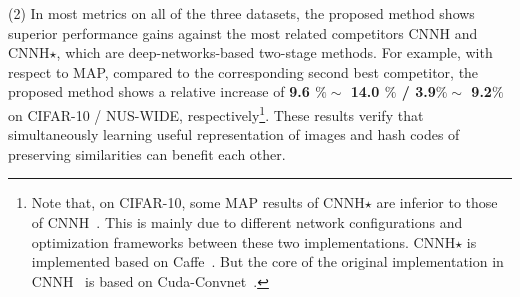 \documentclass[10pt,twocolumn,letterpaper]{article}
\begin{document}
(2) In most metrics on all of the three datasets, the proposed method shows superior performance gains against the most related competitors CNNH and CNNH$\star$, which are deep-networks-based two-stage methods. For example, with respect to MAP, compared to the corresponding second best competitor, the proposed method shows a relative increase of \textbf{9.6 $\%\sim$ 14.0 $\%$ / 3.9$\%\sim$ 9.2$\%$} on CIFAR-10 / NUS-WIDE, respectively\footnote{Note that, on CIFAR-10, some MAP results of CNNH$\star$ are inferior to those of CNNH~\cite{CNNH}. This is mainly due to different network configurations and optimization frameworks between these two implementations. CNNH$\star$ is implemented based on Caffe~\cite{caffe}. But the core of the original implementation in CNNH~\cite{CNNH} is based on Cuda-Convnet~\cite{AlexNet}.}. These results verify that simultaneously learning useful representation of images and hash codes of preserving similarities can benefit each other.

\begin{figure*}[ht!]
  \begin{flushleft}
  \centering
  \caption{\footnotesize The comparison results on SVNH. (a) Precision curves within Hamming radius 2; (b) precision-recall curves of Hamming ranking with 48 bits; (c) precision curves with 48 bits w.r.t. different numbers of top returned samples.}
  \label{fig: svhn-result}
  \end{flushleft}
\end{figure*}
\end{document}
